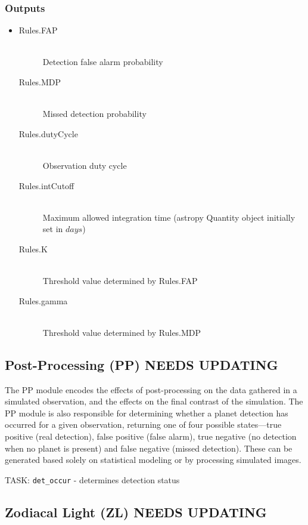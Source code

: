 \documentclass[cleanfoot]{asme2ej}
\begin{document}
\subsubsection*{Outputs}
\begin{itemize}
    \item
    \begin{description}
        \item[Rules.FAP] \hfill \\
        Detection false alarm probability
        \item[Rules.MDP] \hfill \\
        Missed detection probability
        \item[Rules.dutyCycle] \hfill \\
        Observation duty cycle
        \item[Rules.intCutoff] \hfill \\
        Maximum allowed integration time (astropy Quantity object initially set in $ days $)
        \item[Rules.K] \hfill \\
        Threshold value determined by Rules.FAP
        \item[Rules.gamma] \hfill \\
        Threshold value determined by Rules.MDP
    \end{description}
\end{itemize}


\subsection{Post-Processing (PP) NEEDS UPDATING}
The PP module encodes the effects of post-processing on the data gathered in a simulated observation, and the effects on the final contrast of the simulation.  The PP module is also responsible for determining whether a planet detection has occurred for a given observation, returning one of four possible states---true positive (real detection), false positive (false alarm), true negative (no detection when no planet is present) and false negative (missed detection).  These can be generated based solely on statistical modeling or by processing simulated images.
\label{sec:postprocessing}

TASK: \verb+det_occur+ - determines detection status


\subsection{Zodiacal Light (ZL) NEEDS UPDATING}
\end{document}
